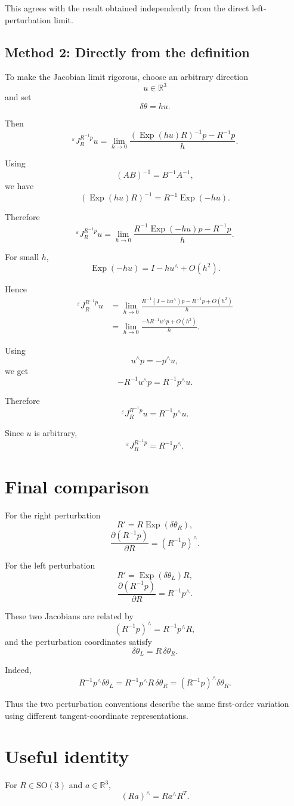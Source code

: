 \documentclass[11pt]{article}
\newcommand{\Exp}{\operatorname{Exp}}
\newcommand{\SO}{\mathrm{SO}}
\newcommand{\R}{\mathbb{R}}
\begin{document}
This agrees with the result obtained independently from the direct
left-perturbation limit.
\subsection{Method 2: Directly from the definition}


To make the Jacobian limit rigorous, choose an arbitrary direction
\[
u\in\R^3
\]
and set
\[
\delta\theta=hu.
\]

Then
\[
{}^{\varepsilon}J_R^{R^{-1}p}u
=
\lim_{h\to0}
\frac{
(\Exp(hu)R)^{-1}p-R^{-1}p
}{h}.
\]

Using
\[
(AB)^{-1}=B^{-1}A^{-1},
\]
we have
\[
(\Exp(hu)R)^{-1}
=
R^{-1}\Exp(-hu).
\]

Therefore
\[
{}^{\varepsilon}J_R^{R^{-1}p}u
=
\lim_{h\to0}
\frac{
R^{-1}\Exp(-hu)p-R^{-1}p
}{h}.
\]

For small $h$,
\[
\Exp(-hu)=I-hu^\wedge+O(h^2).
\]

Hence
\begin{align}
{}^{\varepsilon}J_R^{R^{-1}p}u
&=
\lim_{h\to0}
\frac{
R^{-1}(I-hu^\wedge)p-R^{-1}p+O(h^2)
}{h}
\\
&=
\lim_{h\to0}
\frac{
-hR^{-1}u^\wedge p+O(h^2)
}{h}.
\end{align}

Using
\[
u^\wedge p=-p^\wedge u,
\]
we get
\[
-R^{-1}u^\wedge p
=
R^{-1}p^\wedge u.
\]

Therefore
\[
{}^{\varepsilon}J_R^{R^{-1}p}u
=
R^{-1}p^\wedge u.
\]

Since $u$ is arbitrary,
\[
\boxed{
{}^{\varepsilon}J_R^{R^{-1}p}
=
R^{-1}p^\wedge.
}
\]
\section{Final comparison}

For the right perturbation
\[
R'=R\Exp(\delta\theta_R),
\]
\[
\boxed{
\frac{\partial(R^{-1}p)}{\partial R}
=
(R^{-1}p)^\wedge.
}
\]

For the left perturbation
\[
R'=\Exp(\delta\theta_L)R,
\]
\[
\boxed{
\frac{\partial(R^{-1}p)}{\partial R}
=
R^{-1}p^\wedge.
}
\]

These two Jacobians are related by
\[
(R^{-1}p)^\wedge
=
R^{-1}p^\wedge R,
\]
and the perturbation coordinates satisfy
\[
\delta\theta_L=R\,\delta\theta_R.
\]

Indeed,
\[
R^{-1}p^\wedge\delta\theta_L
=
R^{-1}p^\wedge R\,\delta\theta_R
=
(R^{-1}p)^\wedge\delta\theta_R.
\]

Thus the two perturbation conventions describe the same first-order
variation using different tangent-coordinate representations.
\section*{Useful identity}

For $R\in\SO(3)$ and $a\in\R^3$,
\[
\boxed{(Ra)^\wedge=Ra^\wedge R^T.}
\]
\end{document}
